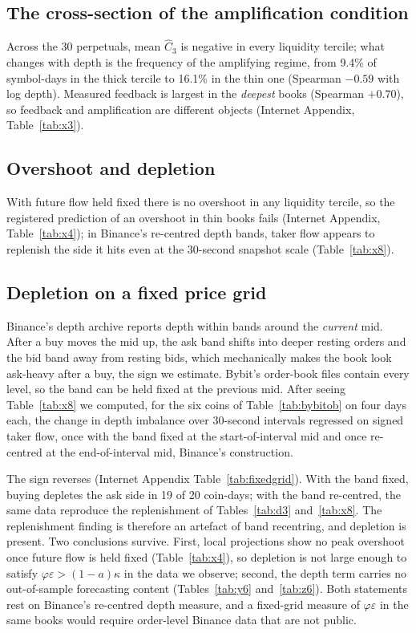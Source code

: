 \documentclass[12pt]{article}
\theoremstyle{definition}
\theoremstyle{remark}
\begin{document}
\subsection{The cross-section of the amplification condition}
Across the 30 perpetuals, mean $\hat C_3$ is negative in every liquidity tercile; what changes with depth is the frequency of the amplifying regime, from 9.4\% of symbol-days in the thick tercile to 16.1\% in the thin one (Spearman $-0.59$ with log depth). Measured feedback is largest in the \emph{deepest} books (Spearman $+0.70$), so feedback and amplification are different objects (Internet Appendix, Table~\ref{tab:x3}).

\subsection{Overshoot and depletion}
With future flow held fixed there is no overshoot in any liquidity tercile, so the registered prediction of an overshoot in thin books fails (Internet Appendix, Table~\ref{tab:x4}); in Binance's re-centred depth bands, taker flow appears to replenish the side it hits even at the 30-second snapshot scale (Table~\ref{tab:x8}).

\subsection{Depletion on a fixed price grid}\label{sec:fixedgrid}
Binance's depth archive reports depth within bands around the \emph{current} mid. After a buy moves the mid up, the ask band shifts into deeper resting orders and the bid band away from resting bids, which mechanically makes the book look ask-heavy after a buy, the sign we estimate. Bybit's order-book files contain every level, so the band can be held fixed at the previous mid. After seeing Table~\ref{tab:x8} we computed, for the six coins of Table~\ref{tab:bybitob} on four days each, the change in depth imbalance over 30-second intervals regressed on signed taker flow, once with the band fixed at the start-of-interval mid and once re-centred at the end-of-interval mid, Binance's construction.



The sign reverses (Internet Appendix Table~\ref{tab:fixedgrid}). With the band fixed, buying depletes the ask side in 19 of 20 coin-days; with the band re-centred, the same data reproduce the replenishment of Tables~\ref{tab:d3} and~\ref{tab:x8}. The replenishment finding is therefore an artefact of band recentring, and depletion is present. Two conclusions survive. First, local projections show no peak overshoot once future flow is held fixed (Table~\ref{tab:x4}), so depletion is not large enough to satisfy $\varphi\varepsilon>(1-a)\kappa$ in the data we observe; second, the depth term carries no out-of-sample forecasting content (Tables~\ref{tab:y6} and~\ref{tab:z6}). Both statements rest on Binance's re-centred depth measure, and a fixed-grid measure of $\varphi\varepsilon$ in the same books would require order-level Binance data that are not public.
\end{document}
